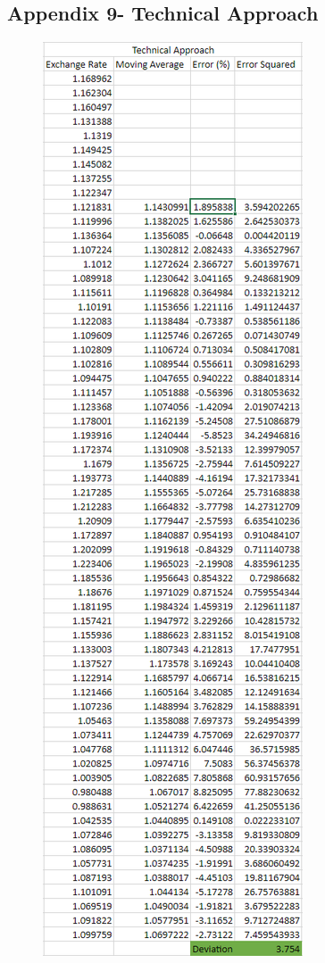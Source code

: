 \documentclass{article}
\let\Oldsubsection\subsection
\renewcommand{\subsection}{\FloatBarrier\Oldsubsection}
\begin{document}
\break

\subsection*{Appendix 9- Technical Approach}


\begin{figure}[h!]
    \centering
    \includegraphics[scale=0.5]{graphs/app9.png}
\end{figure}
\end{document}

